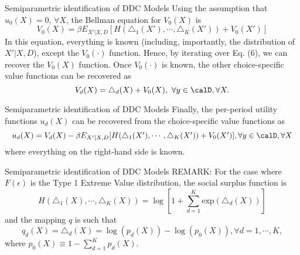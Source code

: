 \begin{frame}{Semiparametric identification of DDC Models}
Using the assumption that $u_0(X) = 0$, $\forall X$, the Bellman equation for $V_0(X)$ is 
\begin{equation}
V_0(X) = \beta E_{X'|X,D} [ H (\triangle_1(X'), \cdots , \triangle_K(X')) + V_0(X')]
\end{equation}
In this equation, everything is known (including, importantly, the distribution of $X'|X, D$), except the $V_0(\cdot)$ function. Hence, by iterating over Eq. (6), we can recover the $V_0(X)$ function. Once $V_0(\cdot)$ is known, the other choice-specific value functions can be recovered as 
\begin{equation*}
V_d(X) = \triangle_d(X) + V_0(X), ~ \forall y \in \calD, \forall X.
\end{equation*}
\end{frame}

\begin{frame}{Semiparametric identification of DDC Models}
Finally, the per-period utility functions $u_d(X)$ can be recovered from the choice-specific value functions as 
\begin{equation*}
\resizebox{.99 \hsize}{!}{$ u_d(X) = V_d(X) - \beta E_{X'|X,D} [ H (\triangle_1 (X'), \cdots , \triangle_K(X')) + V_0(X') ], \forall y \in \calD, \forall X $}
\end{equation*}
where everything on the right-hand side is known. 
\end{frame}


\begin{frame}{Semiparametric identification of DDC Models}
REMARK: For the case where $F (\epsilon)$ is the Type 1 Extreme Value distribution, the social surplus function is 
\begin{equation*}
H(\triangle_1(X), \cdots , \triangle_K (X)) = \log \left [ 1 + \sum^K_{d=1} \text{exp} (\triangle_d(X)) \right ]
\end{equation*}
and the mapping $q$ is such that
\begin{equation*}
q_d(X) = \triangle_d(X) = \log (p_d(X)) - \log(p_0(X)), \forall d = 1, \cdots , K ,
\end{equation*}
where $p_0(X) \equiv 1 - \sum^K_{d=1} p_d(X).$
\end{frame}

